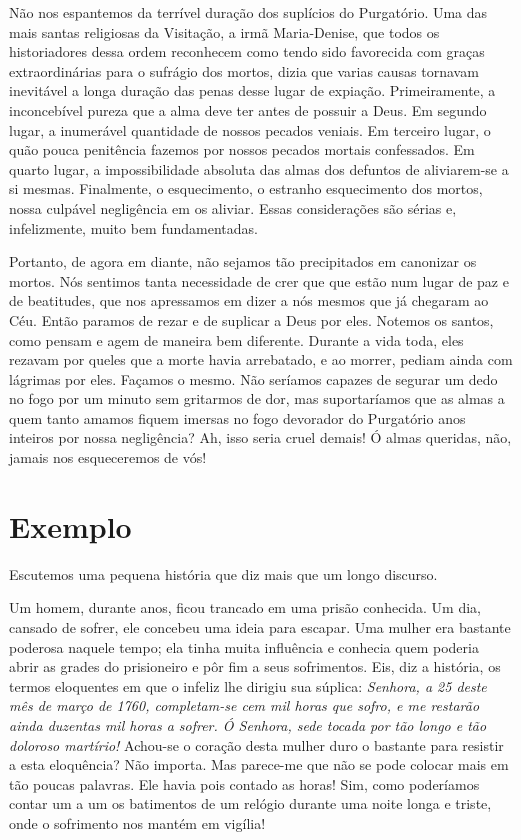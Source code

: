 Não nos espantemos da terrível duração dos suplícios do Purgatório. Uma das mais santas religiosas da Visitação, a irmã Maria-Denise, que todos os historiadores dessa ordem reconhecem como tendo sido favorecida com graças extraordinárias para o sufrágio dos mortos, dizia que varias causas tornavam inevitável a longa duração das penas desse lugar de expiação. Primeiramente, a inconcebível pureza que a alma deve ter antes de possuir a Deus. Em segundo lugar, a inumerável quantidade de nossos pecados veniais. Em terceiro lugar, o quão pouca penitência fazemos por nossos pecados mortais confessados. Em quarto lugar, a impossibilidade absoluta das almas dos defuntos de aliviarem-se a si mesmas. Finalmente, o esquecimento, o estranho esquecimento dos mortos, nossa culpável negligência em os aliviar. Essas considerações são sérias e, infelizmente, muito bem fundamentadas.

Portanto, de agora em diante, não sejamos tão precipitados em canonizar os mortos. Nós sentimos tanta necessidade de crer que que estão num lugar de paz e de beatitudes, que nos apressamos em dizer a nós mesmos que já chegaram ao Céu. Então paramos de rezar e de suplicar a Deus por eles. Notemos os santos, como pensam e agem de maneira bem diferente. Durante a vida toda, eles rezavam por queles que a morte havia arrebatado, e ao morrer, pediam ainda com lágrimas por eles. Façamos o mesmo. Não seríamos capazes de segurar um dedo no fogo por um minuto sem gritarmos de dor, mas suportaríamos que as almas a quem tanto amamos fiquem imersas no fogo devorador do Purgatório anos inteiros por nossa negligência? Ah, isso seria cruel demais! Ó almas queridas, não, jamais nos esqueceremos de vós!


\section*{Exemplo }

Escutemos uma pequena história que diz mais que um longo discurso.

Um homem, durante anos, ficou trancado em uma prisão conhecida. Um dia, cansado de sofrer, ele concebeu uma ideia para escapar. Uma mulher era bastante poderosa naquele tempo; ela tinha muita influência e conhecia quem poderia abrir as grades do prisioneiro e pôr fim a seus sofrimentos. Eis, diz a história, os termos eloquentes em que o infeliz lhe dirigiu sua súplica: \textit{Senhora, a 25 deste mês de março de 1760, completam-se cem mil horas que sofro, e me restarão ainda duzentas mil horas a sofrer. Ó Senhora, sede tocada por tão longo e tão doloroso martírio!}
Achou-se o coração desta mulher duro o bastante para resistir a esta eloquência? Não importa. Mas parece-me que não se pode colocar mais em tão poucas palavras. Ele havia pois contado as horas! Sim, como poderíamos contar um a um os batimentos de um relógio durante uma noite longa e triste, onde o sofrimento nos mantém em vigília! 

